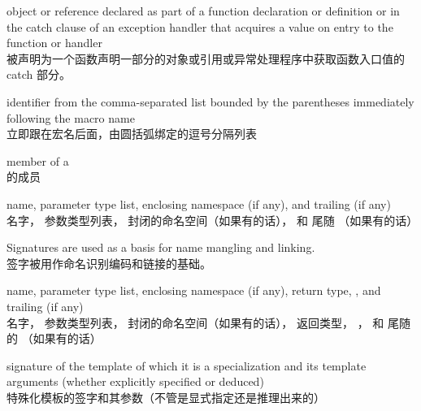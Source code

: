%
%
%
 object or reference declared as part of a function declaration or
definition or in the catch clause of an exception handler that
acquires a value on entry to the function or handler \\
被声明为一个函数声明一部分的对象或引用或异常处理程序中获取函数入口值的 catch 部分。

%
%
 identifier from
the comma-separated list bounded by the parentheses immediately
following the macro name \\
立即跟在宏名后面，由圆括弧绑定的逗号分隔列表

%
%
 member of a  \\
 的成员

%
name,
parameter type list,
enclosing namespace (if any),
and
trailing  (if any) \\
名字，
参数类型列表，
封闭的命名空间（如果有的话），
和
尾随 （如果有的话）


\begin{defnote}
Signatures are used as a basis for
name mangling and linking. \\
签字被用作命名识别编码和链接的基础。
\end{defnote}

%
name,
parameter type list,
enclosing namespace (if any),
return type,
,
and
trailing  (if any) \\
名字，
参数类型列表，
封闭的命名空间（如果有的话），
返回类型，
，
和
尾随的 （如果有的话）

%
 signature of the template of which it is a specialization
and its template arguments (whether explicitly specified or deduced) \\
特殊化模板的签字和其参数（不管是显式指定还是推理出来的）


